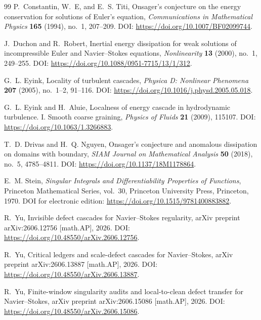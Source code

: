 \documentclass[11pt]{article}
\numberwithin{equation}{section}
\begin{document}
\begin{thebibliography}{99}
P.~Constantin, W.~E, and E.~S. Titi,
\newblock Onsager's conjecture on the energy conservation for solutions of Euler's equation,
\newblock \emph{Communications in Mathematical Physics} \textbf{165} (1994), no.~1, 207--209.
\newblock DOI: \url{https://doi.org/10.1007/BF02099744}.

J.~Duchon and R.~Robert,
\newblock Inertial energy dissipation for weak solutions of incompressible Euler and Navier--Stokes equations,
\newblock \emph{Nonlinearity} \textbf{13} (2000), no.~1, 249--255.
\newblock DOI: \url{https://doi.org/10.1088/0951-7715/13/1/312}.

G.~L. Eyink,
\newblock Locality of turbulent cascades,
\newblock \emph{Physica D: Nonlinear Phenomena} \textbf{207} (2005), no.~1--2, 91--116.
\newblock DOI: \url{https://doi.org/10.1016/j.physd.2005.05.018}.

G.~L. Eyink and H.~Aluie,
\newblock Localness of energy cascade in hydrodynamic turbulence. I. Smooth coarse graining,
\newblock \emph{Physics of Fluids} \textbf{21} (2009), 115107.
\newblock DOI: \url{https://doi.org/10.1063/1.3266883}.

T.~D. Drivas and H.~Q. Nguyen,
\newblock Onsager's conjecture and anomalous dissipation on domains with boundary,
\newblock \emph{SIAM Journal on Mathematical Analysis} \textbf{50} (2018), no.~5, 4785--4811.
\newblock DOI: \url{https://doi.org/10.1137/18M1178864}.

E.~M. Stein,
\newblock \emph{Singular Integrals and Differentiability Properties of Functions},
\newblock Princeton Mathematical Series, vol.~30, Princeton University Press, Princeton, 1970.
\newblock DOI for electronic edition: \url{https://doi.org/10.1515/9781400883882}.


R.~Yu,
\newblock Invisible defect cascades for Navier--Stokes regularity,
\newblock arXiv preprint arXiv:2606.12756 [math.AP], 2026.
\newblock DOI: \url{https://doi.org/10.48550/arXiv.2606.12756}.

R.~Yu,
\newblock Critical ledgers and scale-defect cascades for Navier--Stokes,
\newblock arXiv preprint arXiv:2606.13887 [math.AP], 2026.
\newblock DOI: \url{https://doi.org/10.48550/arXiv.2606.13887}.

R.~Yu,
\newblock Finite-window singularity audits and local-to-clean defect transfer for Navier--Stokes,
\newblock arXiv preprint arXiv:2606.15086 [math.AP], 2026.
\newblock DOI: \url{https://doi.org/10.48550/arXiv.2606.15086}.


\end{thebibliography}
\end{document}
